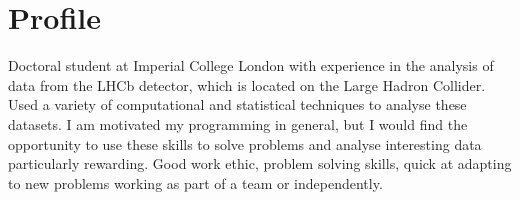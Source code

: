 
\section{Profile}
\cvline{}{}
{
  Doctoral student at Imperial College London with experience in the analysis of data
  from the LHCb detector, which is located on the Large Hadron Collider.
  Used a variety of computational and statistical techniques to analyse these datasets.
  I am motivated my programming in general, but I would find the opportunity to use these skills to
  solve problems and analyse interesting data particularly rewarding.
  Good work ethic, problem solving skills, quick at adapting to new problems working as part of a
  team or independently.

}
















